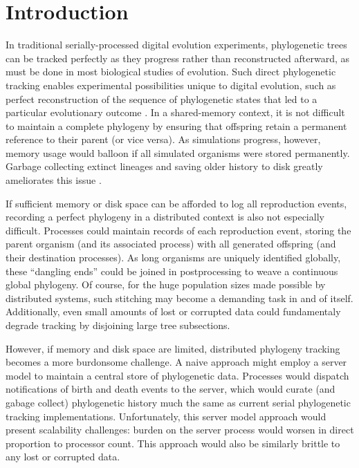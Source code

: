 \section{Introduction} \label{sec:introduction}

In traditional serially-processed digital evolution experiments, phylogenetic trees can be tracked perfectly as they progress \citep{bohm2017mabe,wang2018vine,lalejini2019data} rather than reconstructed afterward, as must be done in most biological studies of evolution.
Such direct phylogenetic tracking enables experimental possibilities unique to digital evolution, such as perfect reconstruction of the sequence of phylogenetic states that led to a particular evolutionary outcome \citep{lenski2003evolutionary, dolson2020interpreting}.
In a shared-memory context, it is not difficult to maintain a complete phylogeny by ensuring that offspring retain a permanent reference to their parent (or vice versa).
As simulations progress, however, memory usage would balloon if all simulated organisms were stored permanently.
Garbage collecting extinct lineages and saving older history to disk greatly ameliorates this issue \citep{bohm2017mabe,dolson2019modes}.

If sufficient memory or disk space can be afforded to log all reproduction events, recording a perfect phylogeny in a distributed context is also not especially difficult.
Processes could maintain records of each reproduction event, storing the parent organism (and its associated process) with all generated offspring (and their destination processes).
As long organisms are uniquely identified globally, these ``dangling ends'' could be joined in postprocessing to weave a continuous global phylogeny.
Of course, for the huge population sizes made possible by distributed systems, such stitching may become a demanding task in and of itself.
Additionally, even small amounts of lost or corrupted data could fundamentaly degrade tracking by disjoining large tree subsections.

However, if memory and disk space are limited, distributed phylogeny tracking becomes a more burdonsome challenge.
A naive approach might employ a server model to maintain a central store of phylogenetic data.
Processes would dispatch notifications of birth and death events to the server, which would curate (and gabage collect) phylogenetic history much the same as current serial phylogenetic tracking implementations.
Unfortunately, this server model approach would present scalability challenges: burden on the server process would worsen in direct proportion to processor count.
This approach would also be similarly brittle to any lost or corrupted data.

